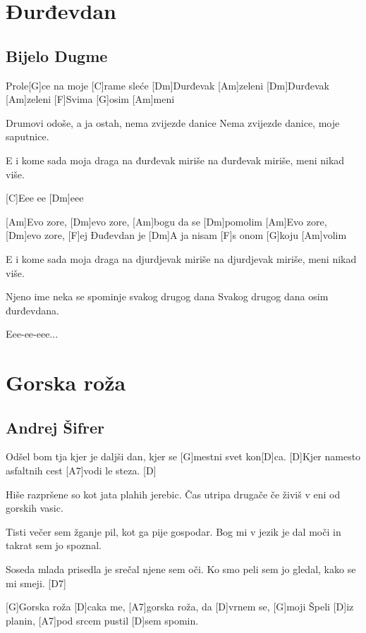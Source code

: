 \documentclass[a4paper,12pt]{article}
\begin{document}
\begin{multicols}{2}
\begin{guitar}
\end{guitar}
\section{Đurđevdan}
\subsection*{Bijelo Dugme}
\begin{guitar}
[Am]Prole[G]ce na moje [C]rame sleće 
[Dm]Durđevak [Am]zeleni 
[Dm]Durđevak [Am]zeleni
[F]Svima [G]osim [Am]meni


Drumovi odoše, a ja ostah, 
nema zvijezde danice
Nema zvijezde danice, 
moje saputnice.


E i kome sada moja draga 
na đurđevak miriše
na đurđevak miriše, 
meni nikad više.


[C]Eee ee [Dm]eee 

[Am]Evo zore, [Dm]evo zore, [Am]bogu da se [Dm]pomolim 
[Am]Evo zore, [Dm]evo zore, [F]ej Đuđevdan je 
[Dm]A ja nisam [F]s onom [G]koju [Am]volim   


E i kome sada moja draga 
na djurdjevak miriše
na djurdjevak miriše, 
meni nikad više.


Njeno ime neka se spominje 
svakog drugog dana
Svakog drugog dana 
osim đurđevdana.

         
Eee-ee-eee...

\end{guitar}
\section{Gorska roža}
\subsection*{Andrej Šifrer}
\begin{guitar}
[D]Odšel bom tja kjer je daljši dan,
kjer se [G]mestni svet kon[D]ca.
[D]Kjer namesto asfaltnih cest
[A7]vodi le steza. [D]


Hiše razpršene so
kot jata plahih jerebic.
Čas utripa drugače če živiš
v eni od gorskih vasic.


Tisti večer sem žganje pil,
kot ga pije gospodar.
Bog mi v jezik je dal moči
in takrat sem jo spoznal.


Soseda mlada prisedla je
srečal njene sem oči.
Ko smo peli sem jo gledal,
kako se mi smeji. [D7]

  
[G]Gorska roža [D]caka me,
[A7]gorska roža, da [D]vrnem se,
[G]moji Špeli [D]iz planin,
[A7]pod srcem pustil [D]sem spomin.



\end{guitar}
\end{multicols}
\end{document}
